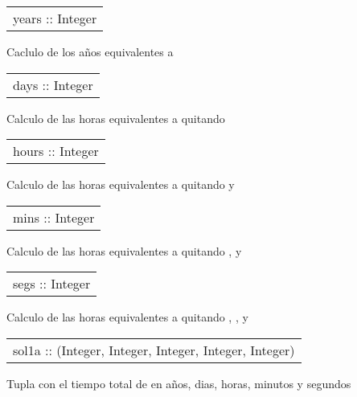 \begin{haddockdesc}
\item[\begin{tabular}{@{}l}
years :: Integer
\end{tabular}]
{\haddockbegindoc
Caclulo de los años equivalentes a \par}
\end{haddockdesc}
\begin{haddockdesc}
\item[\begin{tabular}{@{}l}
days :: Integer
\end{tabular}]
{\haddockbegindoc
Calculo de las horas equivalentes a  quitando \par}
\end{haddockdesc}
\begin{haddockdesc}
\item[\begin{tabular}{@{}l}
hours :: Integer
\end{tabular}]
{\haddockbegindoc
Calculo de las horas equivalentes a  quitando  y \par}
\end{haddockdesc}
\begin{haddockdesc}
\item[\begin{tabular}{@{}l}
mins :: Integer
\end{tabular}]
{\haddockbegindoc
Calculo de las horas equivalentes a  quitando ,  y \par}
\end{haddockdesc}
\begin{haddockdesc}
\item[\begin{tabular}{@{}l}
segs :: Integer
\end{tabular}]
{\haddockbegindoc
Calculo de las horas equivalentes a  quitando , ,  y \par}
\end{haddockdesc}
\begin{haddockdesc}
\item[\begin{tabular}{@{}l}
sol1a :: (Integer, Integer, Integer, Integer, Integer)
\end{tabular}]
{\haddockbegindoc
Tupla con el tiempo total de  en años, dias, horas, minutos y segundos\par}
\end{haddockdesc}
